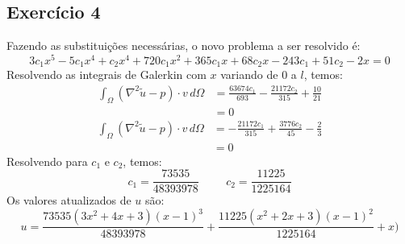 \documentclass[10pt,a4paper]{article}
\begin{document}
	\subsection*{Exercício 4}
	Fazendo as substituições necessárias, o novo problema a ser resolvido é:
	\[3 c_1 x^5-5 c_1 x^4+c_2 x^4+720 c_1 x^2+365 c_1 x+68 c_2 x-243 c_1+51 c_2-2 x = 0\]
	Resolvendo as integrais de Galerkin com $x$ variando de 0 a $l$, temos:
	\begin{align*}
		\int_\Omega \left(\nabla^2\tilde{u}-p\right)\cdot v\,d\Omega &= \frac{63674 c_1}{693}-\frac{21172 c_2}{315}+\frac{10}{21}\\
		&= 0
	\end{align*}
	\begin{align*}
		\int_\Omega \left(\nabla^2\tilde{u}-p\right)\cdot v\,d\Omega &= -\frac{21172 c_1}{315}+\frac{3776 c_2}{45}-\frac{2}{3}\\
		&= 0
	\end{align*}
	Resolvendo para $c_1$ e $c_2$, temos:
	\[c_1=\frac{73535}{48393978}\hspace{1cm}c_2=\frac{11225}{1225164}\]
	Os valores atualizados de $u$ são:
	\[u = \frac{73535 \left(3 x^2+4 x+3\right) (x-1)^3}{48393978}+\frac{11225 \left(x^2+2 x+3\right) (x-1)^2}{1225164}+x)\]
	
\end{document}
